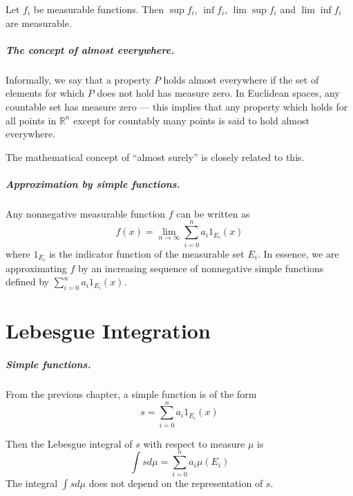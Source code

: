 \documentclass[12pt,english,oneside]{scrbook}
\numberwithin{equation}{chapter}
\theoremstyle{definition}
\theoremstyle{plain}
\begin{document}
Let $f_i$ be measurable functions. Then $\sup f_i$, $\inf f_i$, $\lim \sup f_i$ and $\lim \inf f_i$ are measurable.

\paragraph{The concept of almost everywhere.}

Informally, we say that a property $P$ holds almost everywhere if the set of elements for which $P$ does not hold has measure zero. In Euclidean spaces, any countable set has measure zero --- this implies that any property which holds for all points in $\mathbb{R}^n$ except for countably many points is said to hold almost everywhere.

The mathematical concept of ``almost surely'' is closely related to this.

\paragraph{Approximation by simple functions.}

Any nonnegative measurable function $f$ can be written as
\begin{equation}
  f(x) = \lim_{n\to \infty} \sum_{i=0}^n a_i 1_{E_i}(x)
\end{equation}
where $1_{E_i}$ is the indicator function of the measurable set $E_i$. In essence, we are approximating $f$ by an increasing sequence of nonnegative simple functions defined by $\sum_{i=0}^n a_i 1_{E_i}(x)$.

\chapter{Lebesgue Integration}

\paragraph{Simple functions.}

From the previous chapter, a simple function is of the form
\begin{equation}
  s = \sum_{i=0}^n a_i 1_{E_i}(x)
\end{equation}

Then the Lebesgue integral of $s$ with respect to measure $\mu$ is
\begin{equation}
  \int s d\mu = \sum_{i=0}^n a_i \mu (E_i)
\end{equation}
The integral $\int s d\mu$ does not depend on the representation of $s$.
\end{document}
